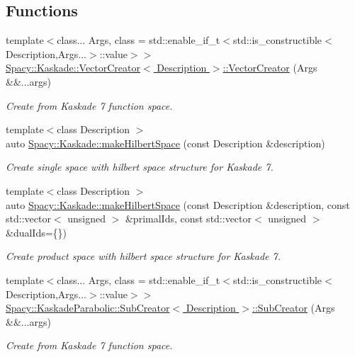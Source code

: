 \subsection*{Functions}
\begin{DoxyCompactItemize}
\item 
{\footnotesize template$<$class... Args, class  = std\-::enable\-\_\-if\-\_\-t$<$std\-::is\-\_\-constructible$<$\-Description,\-Args...$>$\-::value$>$$>$ }\\\hyperlink{group__VectorSpaceGroup_ga89de372343310640870077e6167df3f4}{Spacy\-::\-Kaskade\-::\-Vector\-Creator$<$ Description $>$\-::\-Vector\-Creator} (Args \&\&...args)
\begin{DoxyCompactList}\small\item\em Create from Kaskade 7 function space. \end{DoxyCompactList}\item 
{\footnotesize template$<$class Description $>$ }\\auto \hyperlink{group__VectorSpaceGroup_ga04d45446864bbf87770d02eade7b64cf}{Spacy\-::\-Kaskade\-::make\-Hilbert\-Space} (const Description \&description)
\begin{DoxyCompactList}\small\item\em Create single space with hilbert space structure for Kaskade 7. \end{DoxyCompactList}\item 
{\footnotesize template$<$class Description $>$ }\\auto \hyperlink{group__VectorSpaceGroup_ga221db25c41371a2a823a6b569d735ef6}{Spacy\-::\-Kaskade\-::make\-Hilbert\-Space} (const Description \&description, const std\-::vector$<$ unsigned $>$ \&primal\-Ids, const std\-::vector$<$ unsigned $>$ \&dual\-Ids=\{\})
\begin{DoxyCompactList}\small\item\em Create product space with hilbert space structure for Kaskade 7. \end{DoxyCompactList}\item 
{\footnotesize template$<$class... Args, class  = std\-::enable\-\_\-if\-\_\-t$<$std\-::is\-\_\-constructible$<$\-Description,\-Args...$>$\-::value$>$$>$ }\\\hyperlink{group__VectorSpaceGroup_ga7071ba5e2db9acaf6a4de415cb50ae1e}{Spacy\-::\-Kaskade\-Parabolic\-::\-Sub\-Creator$<$ Description $>$\-::\-Sub\-Creator} (Args \&\&...args)
\begin{DoxyCompactList}\small\item\em Create from Kaskade 7 function space. \end{DoxyCompactList}\item 

\end{DoxyCompactItemize}
